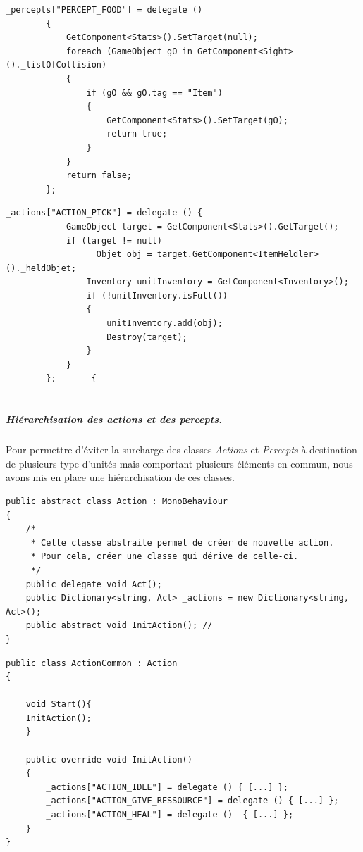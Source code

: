 \documentclass{report}
\begin{document}
\begin{lstlisting}[language={[Sharp]C},label={lst:unitScript}, caption=  Extrait du code du script PerceptUnit.cs]
 _percepts["PERCEPT_FOOD"] = delegate ()
        {
            GetComponent<Stats>().SetTarget(null);
            foreach (GameObject gO in GetComponent<Sight>()._listOfCollision)
            {
                if (gO && gO.tag == "Item")
                {
                    GetComponent<Stats>().SetTarget(gO);
                    return true;
                }
            }
            return false;
        };
\end{lstlisting}
\begin{lstlisting}[language={[Sharp]C},label={lst:unitScript}, caption=  Extrait du code du script ActionUnit.cs]
_actions["ACTION_PICK"] = delegate () {
            GameObject target = GetComponent<Stats>().GetTarget();
            if (target != null)
                  Objet obj = target.GetComponent<ItemHeldler>()._heldObjet;
                Inventory unitInventory = GetComponent<Inventory>();
                if (!unitInventory.isFull())
                {
                    unitInventory.add(obj);
                    Destroy(target);
                }
            }
        };       {
   
\end{lstlisting}
\subparagraph{Hiérarchisation des actions et des percepts.}
Pour permettre d'éviter la surcharge des classes \textit{Actions} et \textit{Percepts} à destination de plusieurs type d'unités mais comportant plusieurs éléments en commun, nous avons mis en place une hiérarchisation de ces classes. 

\begin{lstlisting}[language={[Sharp]C},label={lst:ActionScript}, caption=  Code du script Action.cs]
public abstract class Action : MonoBehaviour
{
    /*
     * Cette classe abstraite permet de créer de nouvelle action.
     * Pour cela, créer une classe qui dérive de celle-ci.
     */
    public delegate void Act();
    public Dictionary<string, Act> _actions = new Dictionary<string, Act>();
    public abstract void InitAction(); // 
}
\end{lstlisting}

\begin{lstlisting}[language={[Sharp]C},label={lst:ActionCommonScript}, caption=  Code du script ActionCommon.cs dérivant de la classe Action.cs]
public class ActionCommon : Action
{

    void Start(){      
    InitAction();
    }

    public override void InitAction()
    {
        _actions["ACTION_IDLE"] = delegate () { [...] };
        _actions["ACTION_GIVE_RESSOURCE"] = delegate () { [...] };
        _actions["ACTION_HEAL"] = delegate ()  { [...] };
    }
}
\end{lstlisting}
\end{document}
